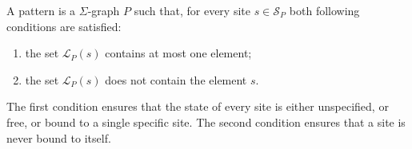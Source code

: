 \documentclass{entcs}
\newcommand{\keep}[3]{#1{#2}{#3}}
\newcommand{\graphsymb}{G}
\newcommand{\sites}[1][\graphsymb]{\mathcal{S}_{#1}}
\newcommand{\links}[1][\graphsymb]{\mathcal{L}_{#1}}
\begin{document}


\begin{defn}[patterns]
A pattern is a $\Sigma$-graph $P$ such that, for every site $s\in\sites[P]$ both following conditions are satisfied:
\begin{enumerate}
\item the set $\links[P](s)$ contains at most one element;
\item the set $\links[P](s)$ does not contain the element $s$.
\end{enumerate}
\end{defn}
The first condition ensures that the state of every site is either unspecified,
or free, or bound to a single specific site. The second condition ensures that a site is never bound to itself.
\end{document}
